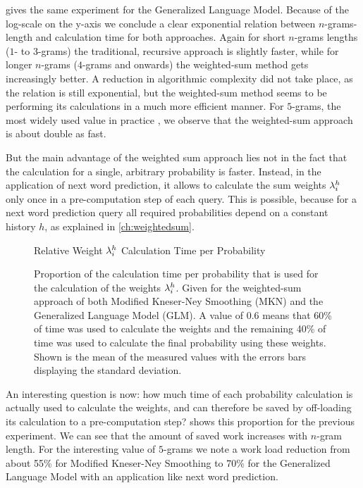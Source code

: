  gives the same experiment for the Generalized
Language Model.
Because of the log-scale on the y-axis we conclude a clear exponential relation
between $n$-grams-length and calculation time for both approaches.
Again for short $n$-grams lengths ($1$- to $3$-grams) the traditional, recursive
approach is slightly faster, while for longer $n$-grams ($4$-grams and onwards)
the weighted-sum method gets increasingly better.
A reduction in algorithmic complexity did not take place, as the relation is
still exponential, but the weighted-sum method seems to be performing its
calculations in a much more efficient manner.
For $5$-grams, the most widely used value in practice
\parencite{JurafskyMartin2009,Goodman2001,Stolcke2000}, we observe that the
weighted-sum approach is about double as fast.

But the main advantage of the weighted sum approach lies not in the fact
that the calculation for a single, arbitrary probability is faster.
Instead, in the application of next word prediction, it allows to calculate the
sum weights $\lambda^h_i$ only once in a pre-computation step of each query.
This is possible, because for a next word prediction query all required
probabilities depend on a constant history $h$, as explained in
\cref{ch:weightedsum}.

\begin{figure}
  \centering
  Relative Weight $\lambda^h_i$ Calculation Time per Probability
  \\[1.5ex]
  \begin{minipage}{0.7\textwidth}
    \centering
    
  \end{minipage}
  \caption{Proportion of the calculation time per probability that is used
    for the calculation of the weights $\lambda^h_i$.
    Given for the weighted-sum approach of both Modified Kneser-Ney Smoothing
    (MKN) and the Generalized Language Model (GLM).
    A value of \num{0.6} means that 60\% of time
    was used to calculate the weights and the remaining 40\% of time was used
    to calculate the final probability using these weights.
    Shown is the mean of the measured values with the errors bars displaying the
    standard deviation.}
  \label{fig:evaluation-weight-times}
\end{figure}

An interesting question is now: how much time of each probability calculation
is actually used to calculate the weights, and can therefore be saved by
off-loading its calculation to a pre-computation step?
 shows this proportion for the previous
experiment.
We can see that the amount of saved work increases with $n$-gram length.
For the interesting value of $5$-grams we note a work load reduction from
about 55\% for Modified Kneser-Ney Smoothing to 70\% for the Generalized
Language Model with an application like next word prediction.

